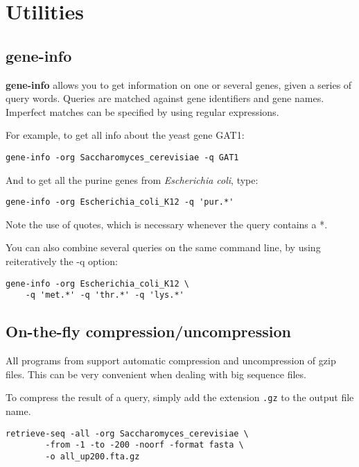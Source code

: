 \section{Utilities}

\subsection{gene-info}

\textbf{gene-info} allows you to get information on one or 
several genes, given a series of query words. Queries are matched
against gene identifiers and gene names. Imperfect matches can be
specified by using regular expressions.

For example, to get all info about the yeast gene GAT1:

\begin{verbatim}
gene-info -org Saccharomyces_cerevisiae -q GAT1
\end{verbatim}

And to get all the purine genes from \textit{Escherichia coli}, type: 

\begin{verbatim}
gene-info -org Escherichia_coli_K12 -q 'pur.*'
\end{verbatim}

Note the use of quotes, which is necessary whenever the query contains
a *.

You can also combine several queries on the same command line, by
using reiteratively the -q option:

\begin{verbatim}
gene-info -org Escherichia_coli_K12 \
    -q 'met.*' -q 'thr.*' -q 'lys.*'
\end{verbatim}

\subsection{On-the-fly compression/uncompression}
All programs from \RSAT support automatic compression and
uncompression of gzip files. This can be very convenient when dealing
with big sequence files.

To compress the result of a query, simply add the extension
\texttt{.gz} to the output file name.

\begin{verbatim}
retrieve-seq -all -org Saccharomyces_cerevisiae \
        -from -1 -to -200 -noorf -format fasta \
        -o all_up200.fta.gz
\end{verbatim}

